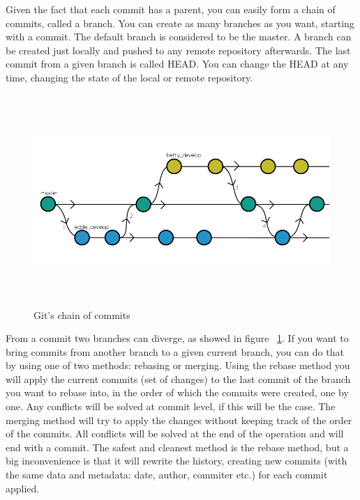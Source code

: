         Given the fact that each commit has a parent, you can easily form a chain of commits, called a branch. You can create as many branches as you want, starting with a commit. The default branch is considered to be the master. A branch can be created just locally and pushed to any remote repository afterwards. The last commit from a given branch is called HEAD.
        You can change the HEAD at any time, changing the state of the local or remote repository.
        
        \begin{figure}[h]
           \begin{center}
               \includegraphics[width=15cm, height=8cm]{theoretical/git_flow.png}
            \end{center}
            \label{fig:git-flow}
            \caption{Git's chain of commits}
        \end{figure}
        
        From a commit two branches can diverge, as showed in figure ~\ref{fig:git-flow}. If you want to bring commits from another branch to a given current branch, you can do that by using one of two methods: rebasing or merging. 
        Using the rebase method you will apply the current commits (set of changes) to the last commit of the branch you want to rebase into, in the order of which the commits were created, one by one. Any conflicts will be solved at commit level, if this will be the case. 
        The merging method will try to apply the changes without keeping track of the order of the commits. All conflicts will be solved at the end of the operation and will end with a commit. 
        The safest and cleanest method is the rebase method, but a big inconvenience is that it will rewrite the history, creating new commits (with the same data and metadata: date, author, commiter etc.) for each commit applied.
        
